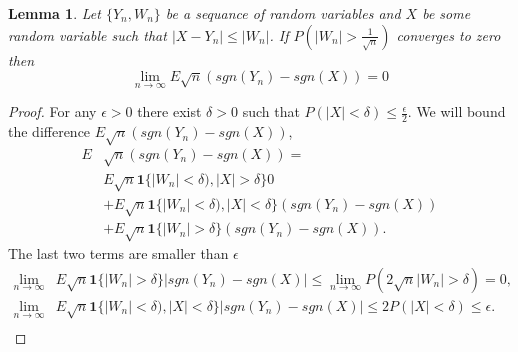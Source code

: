 \documentclass{article}
\newtheorem{lemma}{Lemma}
\begin{document}
\begin{lemma}
 Let $\{Y_n,W_n\}$ be a sequance of random variables and $X$ be some random variable such that $|X-Y_n| \leq |W_n|$. If $P(|W_n| > \frac {1}{\sqrt n} )$ converges to zero   then
 \[
  \lim_{n \to \infty } E \sqrt n (sgn(Y_n) - sgn(X)) = 0
 \]
\end{lemma} 
\begin{proof}
For any $\epsilon> 0$ there exist $\delta>0$ such that $P(|X| < \delta  ) \leq \frac \epsilon 2$. We will bound the difference $E \sqrt n (sgn(Y_n) - sgn(X))$,
\begin{align}
E & \sqrt n (sgn(Y_n) - sgn(X))= \\
& E \sqrt n \mathbf  1 \{ |W_n| < \delta ) , |X| > \delta \} 0 \\
&+ E \sqrt n \mathbf 1 \{ |W_n| < \delta)  , |X| < \delta\}  (sgn(Y_n) - sgn(X)) \\
&+ E \sqrt n \mathbf 1 \{ |W_n| > \delta  \}  (sgn(Y_n) - sgn(X)).  
 \end{align}
The last two terms are smaller than $\epsilon$
 \begin{align}
\lim_{n \to \infty}&   E\sqrt n \mathbf 1 \{ |W_n| > \delta   \}  |sgn(Y_n) - sgn(X)| \leq \lim_{n \to \infty} P(2 \sqrt n |W_n|>\delta) =0, \\
\lim_{n \to \infty}&   E \sqrt n \mathbf 1 \{ |W_n| < \delta )  , |X| < \delta  \}  |sgn(Y_n) - sgn(X)| \leq 2 P(|X| < \delta) \leq \epsilon. \\
\end{align}
\end{proof}
\end{document}
